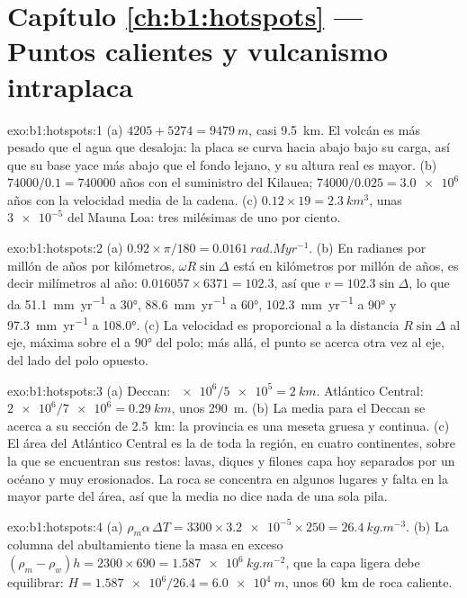 \section*{Capítulo \ref{ch:b1:hotspots} --- Puntos calientes y vulcanismo intraplaca}

\begin{solution}{exo:b1:hotspots:1}
(a) $4205 + 5274 = \qty{9479}{m}$, casi \qty{9.5}{km}. El volcán es más pesado que el agua que desaloja: la placa se curva hacia abajo bajo su carga,
así que su base yace más abajo que el fondo lejano, y su altura real es mayor.
(b) $74000/0.1 = \num{740000}$ años con el suministro del Kilauea;
$74000/0.025 = \num{3.0e6}$ años con la velocidad media de la cadena. (c)
$0.12\times19 = \qty{2.3}{km^3}$, unas $\num{3e-5}$ del Mauna Loa: tres
milésimas de uno por ciento.
\end{solution}

\begin{solution}{exo:b1:hotspots:2}
(a) $0.92\times\pi/180 = \qty{0.0161}{rad.Myr^{-1}}$. (b) En radianes por
millón de años por kilómetros, $\omega R\sin\Delta$ está en kilómetros por
millón de años, es decir milímetros al año: $0.016057\times6371 = 102.3$, así que
$v = 102.3\sin\Delta$, lo que da \qty{51.1}{mm.yr^{-1}} a \ang{30},
\qty{88.6}{mm.yr^{-1}} a \ang{60}, \qty{102.3}{mm.yr^{-1}} a \ang{90} y
\qty{97.3}{mm.yr^{-1}} a \ang{108.0}. (c) La velocidad es proporcional a la
distancia $R\sin\Delta$ al eje, máxima sobre el  a \ang{90}
del polo; más allá, el punto se acerca otra vez al eje, del lado del polo
opuesto.
\end{solution}

\begin{solution}{exo:b1:hotspots:3}
(a) Deccan: $\num{e6}/\num{5e5} = \qty{2}{km}$. Atlántico Central:
$\num{2e6}/\num{7e6} = \qty{0.29}{km}$, unos \qty{290}{m}. (b) La media para
el Deccan se acerca a su sección de \qty{2.5}{km}: la provincia es una meseta gruesa y continua. (c) El área del Atlántico Central es la de toda la región, en cuatro continentes, sobre la que se encuentran sus restos: lavas, diques y filones capa hoy separados por un océano y muy erosionados. La roca se concentra en algunos lugares y falta en la mayor parte del área, así que la media no dice nada de una sola pila.
\end{solution}

\begin{solution}{exo:b1:hotspots:4}
(a) $\rho_m\alpha\,\Delta T = 3300\times\num{3.2e-5}\times250 =
\qty{26.4}{kg.m^{-3}}$. (b) La columna del abultamiento tiene la masa en exceso
$(\rho_m - \rho_w)h = 2300\times690 = \qty{1.587e6}{kg.m^{-2}}$, que la
capa ligera debe equilibrar: $H = \num{1.587e6}/26.4 = \qty{6.0e4}{m}$, unos
\qty{60}{km} de roca caliente.
\end{solution}

